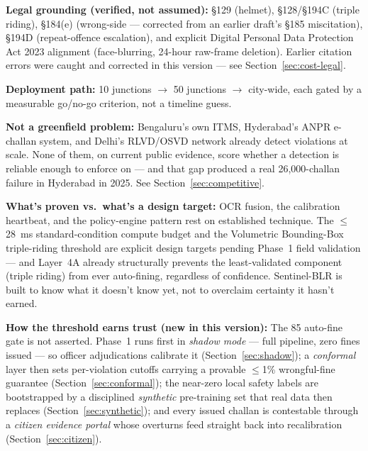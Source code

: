 \documentclass[11pt,a4paper]{article}
\begin{document}
\begin{callout}
\textbf{Legal grounding (verified, not assumed):} \S129 (helmet), \S128/\S194C (triple riding), \S184(e) (wrong-side --- corrected from an earlier draft's \S185 miscitation), \S194D (repeat-offence escalation), and explicit Digital Personal Data Protection Act 2023 alignment (face-blurring, 24-hour raw-frame deletion). Earlier citation errors were caught and corrected in this version --- see Section~\ref{sec:cost-legal}.

\textbf{Deployment path:} 10 junctions $\rightarrow$ 50 junctions $\rightarrow$ city-wide, each gated by a measurable go/no-go criterion, not a timeline guess.

\textbf{Not a greenfield problem:} Bengaluru's own ITMS, Hyderabad's ANPR e-challan system, and Delhi's RLVD/OSVD network already detect violations at scale. None of them, on current public evidence, score whether a detection is reliable enough to enforce on --- and that gap produced a real 26,000-challan failure in Hyderabad in 2025. See Section~\ref{sec:competitive}.

\vspace{0.3em}
\textbf{What's proven vs.\ what's a design target:} OCR fusion, the calibration heartbeat, and the policy-engine pattern rest on established technique. The $\leq$28~ms standard-condition compute budget and the Volumetric Bounding-Box triple-riding threshold are explicit design targets pending Phase~1 field validation --- and Layer~4A already structurally prevents the least-validated component (triple riding) from ever auto-fining, regardless of confidence. Sentinel-BLR is built to know what it doesn't know yet, not to overclaim certainty it hasn't earned.

\vspace{0.3em}
\vspace{0.3em}
\textbf{How the threshold earns trust (new in this version):} The 85 auto-fine gate is not asserted. Phase~1 runs first in \emph{shadow mode} --- full pipeline, zero fines issued --- so officer adjudications calibrate it (Section~\ref{sec:shadow}); a \emph{conformal} layer then sets per-violation cutoffs carrying a provable $\le$1\% wrongful-fine guarantee (Section~\ref{sec:conformal}); the near-zero local safety labels are bootstrapped by a disciplined \emph{synthetic} pre-training set that real data then replaces (Section~\ref{sec:synthetic}); and every issued challan is contestable through a \emph{citizen evidence portal} whose overturns feed straight back into recalibration (Section~\ref{sec:citizen}).


\end{callout}
\end{document}
